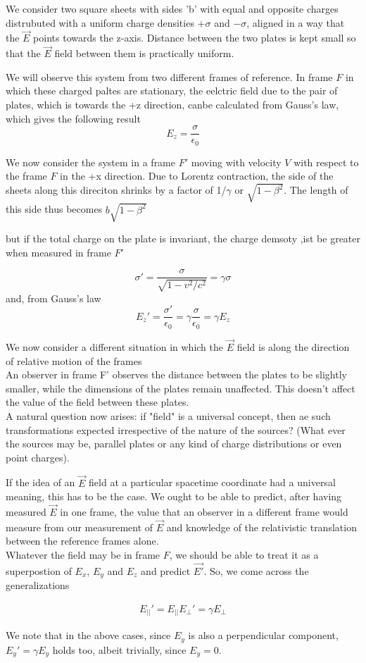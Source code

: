\documentclass{article}
\begin{document}
We consider two square sheets with sides 'b' with equal and opposite charges distrubuted with a uniform charge densities $+\sigma$ and $-\sigma$, aligned in a way that the $\vec{E}$ points towards the z-axis. Distance between the two plates is kept small so that the $\vec{E}$ field between them is practically uniform.

We will observe this system from two different frames of reference. In frame $F$ in which these charged paltes are stationary, the eelctric field due to the pair of plates, which is towards the +z direction, canbe calculated from Gauss's law, which gives the following result
$$ E_z = \frac{\sigma}{\epsilon_0}$$

We now consider the system in a frame $F'$ moving with velocity $V$ with respect to the frame $F$ in the +x direction. Due to Lorentz contraction, the side of the sheets along this direciton shrinks by a factor of 1/$\gamma$ or $\sqrt{1-\beta^2}$. The length of this side thus becomes $b\sqrt{1-\beta^2}$

but if the total charge on the plate is invariant, the charge demsoty ,ist be greater when measured in frame $F'$

$$ \sigma' = \frac{\sigma}{\sqrt{1-v^2/c^2}} = \gamma\sigma$$
and, from Gauss's law
$$ E_z' = \frac{\sigma'}{\epsilon_0} = \gamma\frac{\sigma}{\epsilon_0} = \gamma E_z $$

We now consider a different situation in which the $\vec{E}$ field is along the direction of relative motion of the frames\\

An observer in frame F' observes the distance between the plates to be slightly smaller, while the dimensions of the plates remain unaffected. This doesn't affect the value of the field between these plates.\\

A natural question now arises: if "field" is a universal concept, then ae such transformations expected irrespective of the nature of the sources? (What ever the sources may be, parallel plates or any kind of charge distributions or even point charges).

If the idea of an $\vec{E}$ field at a particular spacetime coordinate had a universal meaning, this has to be the case. We ought to be able to predict, after having measured $\vec{E}$ in one frame, the value that an observer in a different frame would measure from our measurement of $\vec{E}$ and knowledge of the relativistic translation between the reference frames alone.\\

Whatever the field may be in frame $F$, we should be able to treat it as a superpostion of $E_x$, $E_y$ and $E_z$ and predict $\vec{E'}$. So, we come across the generalizations

\begin{eqnarray}
E_{||}' = E_{||}
E_{\perp}' = \gamma E_{\perp}
\end{eqnarray}

We note that in the above cases, since $E_y$ is also a perpendicular component, $E_y' = \gamma E_y$ holds too, albeit trivially, since $E_y = 0$.
\end{document}
